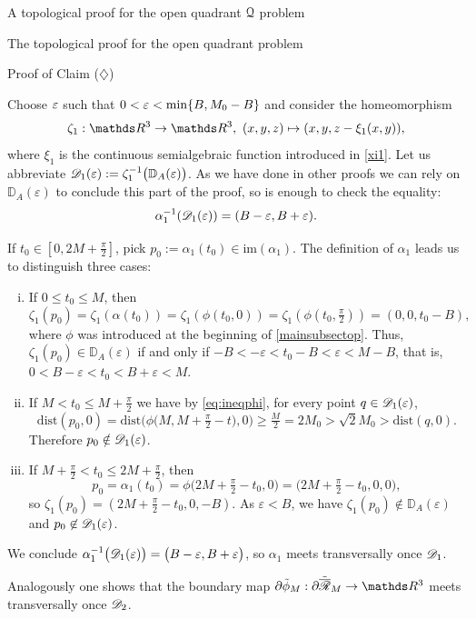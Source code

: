 \documentclass[11pt, a4paper, english, twoside, notitlepage, openright]{report}
\begin{document}
\begin{chapter}{A topological proof for the open quadrant $\mathcal{Q}$ problem}
\begin{section}{The topological proof for the open quadrant problem}
\begin{subsection}{Proof of Claim ($\diamondsuit$)}
\begin{lemma}
\begin{Proof}
Choose $\varepsilon$ such that $0<\varepsilon<\min\{B,M_0-B\}$ and consider the homeomorphism
$$
\zeta_1:\R^3\to\R^3,\ (x,y,z)\mapsto(x,y,z-\xi_1(x,y)),
$$
where $\xi_1$ is the continuous semialgebraic function introduced in \eqref{xi1}. Let us abbreviate $\mathscr{D}_1(\varepsilon):=\zeta_1^{-1}\big({\mathbb D}_A(\varepsilon)\big)$. As we have done in other proofs we can rely on ${\mathbb D}_A(\varepsilon)$ to conclude this part of the proof, so is enough to check the equality:
$$
\alpha_1^{-1}(\mathscr{D}_1(\varepsilon))=(B-\varepsilon,B+\varepsilon). 
$$

If $t_0\in[0,2M+\frac{\pi}{2}]$, pick $p_0:=\alpha_1(t_0)\in\text{im}(\alpha_1)$. The definition of $\alpha_1$ leads us to distinguish three cases:

\begin{enumerate}[(i)]
\item If $0\le t_0\le M$, then 
$$
\zeta_1(p_0)=\zeta_1(\alpha(t_0))=\zeta_1(\phi(t_0,0))=\zeta_1(\phi(t_0,\tfrac{\pi}{2}))=(0,0,t_0-B),
$$
where $\phi$ was introduced at the beginning of \ref{mainsubsectop}. Thus, $\zeta_1(p_0)\in{\mathbb D}_A(\varepsilon)$ if and only if $-B<-\varepsilon<t_0-B<\varepsilon<M-B$, that is, $0<B-\varepsilon<t_0<B+\varepsilon<M$. 

\item If $M<t_0\le M+\frac{\pi}{2}$ we have by \eqref{eq:ineqphi}, for every point $q\in\mathscr{D}_1(\varepsilon)$,  
$$
\text{dist}(p_0,0)=\text{dist}\big(\phi\big(M,M+\tfrac{\pi}{2}-t\big),0\big)\geq\tfrac{M}{2}=2M_0>\sqrt{2}M_0>\text{dist}(q,0).
$$ 
Therefore $p_0\notin\mathscr{D}_1(\varepsilon)$.

\item If $M+\frac{\pi}{2}<t_0\le 2M+\frac{\pi}{2}$, then 
$$
p_0=\alpha_1(t_0)=\phi\big(2M+\tfrac{\pi}{2}-t_0,0\big)=\big(2M+\tfrac{\pi}{2}-t_0,0,0\big),
$$ 
so $\zeta_1(p_0)=(2M+\tfrac{\pi}{2}-t_0,0,-B)$. As $\varepsilon<B$, we have $\zeta_1(p_0)\not\in{\mathbb D}_A(\varepsilon)$ and $p_0\not\in\mathscr{D}_1(\varepsilon)$.
\end{enumerate}

We conclude $\alpha_1^{-1}\big(\mathscr{D}_1(\varepsilon)\big)=\big(B-\varepsilon,B+\varepsilon\big)$, so $\alpha_1$ meets transversally once $\mathscr{D}_1$. 

Analogously one shows that the boundary map $\partial\tilde{\phi}_M:\partial\tilde{\overline{\Rr}}_M\to\R^3$ meets transversally once $\mathscr{D}_2$.


\end{Proof}
\end{lemma}
\end{subsection}
\end{section}
\end{chapter}
\end{document}
